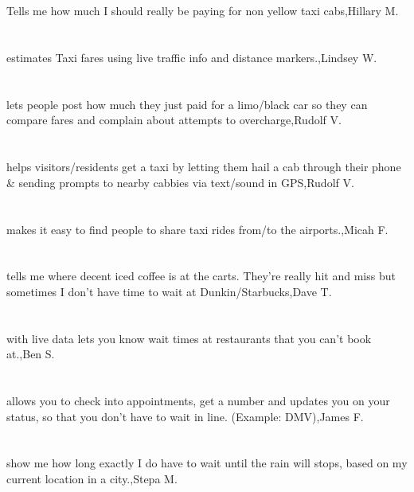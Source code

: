 \section{} Tells me how much I should really be paying for non  yellow taxi cabs,Hillary M.	
\section{}estimates Taxi fares using live traffic info and distance markers.,Lindsey W.	
\section{}lets people post how much they just paid for a limo/black car so they can compare fares and complain about attempts to overcharge,Rudolf V.	
\section{} helps visitors/residents get a taxi by letting them hail a cab through their phone \& sending prompts to nearby cabbies via text/sound in GPS,Rudolf V.	
\section{}makes it easy to find people to share taxi rides from/to the airports.,Micah F.	
\section{}tells me where decent iced coffee is at the carts.  They're really hit and miss but sometimes I don't have time to wait at Dunkin/Starbucks,Dave T.	
\section{}with live data lets you know wait times at restaurants that you can't book at.,Ben S.	
\section{}allows you to check into appointments, get a number and updates you on your status, so that you don't have to wait in line. (Example: DMV),James F.	
\section{}show me how long exactly I do have to wait until the rain will stops, based on my current location in a city.,Stepa M.	
